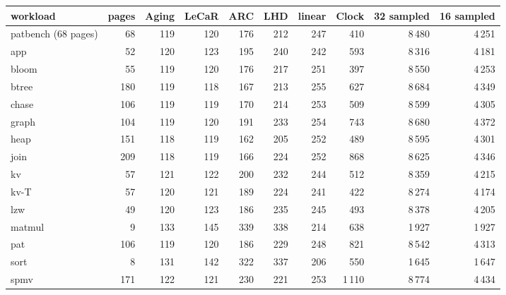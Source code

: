 \begin{tabular}{lrrrrrrrrr}
\toprule
workload & pages & Aging & LeCaR & ARC & LHD & linear & Clock & 32 sampled & 16 sampled \\
\midrule
patbench (68 pages) & 68 & 119 & 120 & 176 & 212 & 247 & 410 & 8\,480 & 4\,251 \\
app & 52 & 120 & 123 & 195 & 240 & 242 & 593 & 8\,316 & 4\,181 \\
bloom & 55 & 119 & 120 & 176 & 217 & 251 & 397 & 8\,550 & 4\,253 \\
btree & 180 & 119 & 118 & 167 & 213 & 255 & 627 & 8\,684 & 4\,349 \\
chase & 106 & 119 & 119 & 170 & 214 & 253 & 509 & 8\,599 & 4\,305 \\
graph & 104 & 119 & 120 & 191 & 233 & 254 & 743 & 8\,680 & 4\,372 \\
heap & 151 & 118 & 119 & 162 & 205 & 252 & 489 & 8\,595 & 4\,301 \\
join & 209 & 118 & 119 & 166 & 224 & 252 & 868 & 8\,625 & 4\,346 \\
kv & 57 & 121 & 122 & 200 & 232 & 244 & 512 & 8\,359 & 4\,215 \\
kv-T & 57 & 120 & 121 & 189 & 224 & 241 & 422 & 8\,274 & 4\,174 \\
lzw & 49 & 120 & 123 & 186 & 235 & 245 & 493 & 8\,378 & 4\,205 \\
matmul & 9 & 133 & 145 & 339 & 338 & 214 & 638 & 1\,927 & 1\,927 \\
pat & 106 & 119 & 120 & 186 & 229 & 248 & 821 & 8\,542 & 4\,313 \\
sort & 8 & 131 & 142 & 322 & 337 & 206 & 550 & 1\,645 & 1\,647 \\
spmv & 171 & 122 & 121 & 230 & 221 & 253 & 1\,110 & 8\,774 & 4\,434 \\
\bottomrule
\end{tabular}
